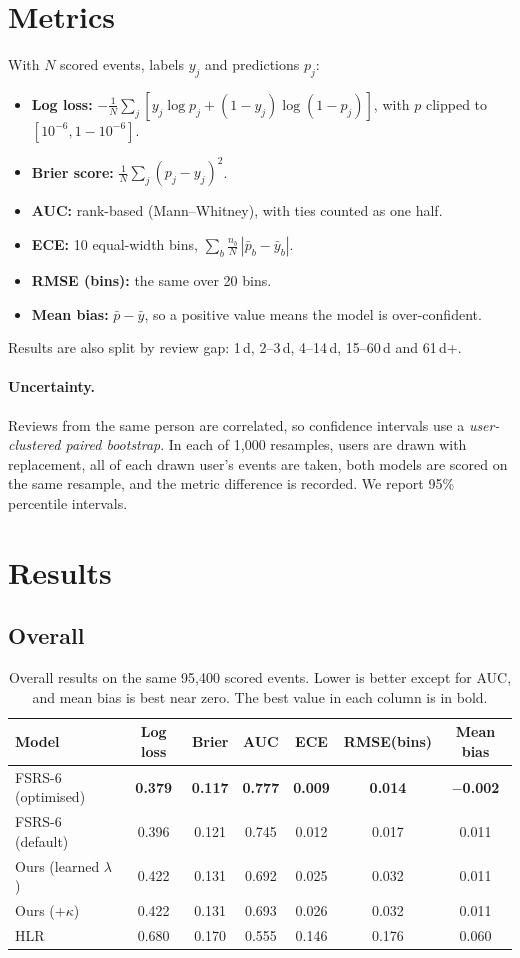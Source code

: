 \documentclass[11pt,a4paper]{article}
\newcommand{\best}[1]{\textbf{#1}}
\begin{document}
\section{Metrics}
With $N$ scored events, labels $y_j$ and predictions $p_j$:
\begin{itemize}
  \item \textbf{Log loss:} $-\frac1N\sum_j[y_j\log p_j+(1-y_j)\log(1-p_j)]$, with $p$ clipped to $[10^{-6},1-10^{-6}]$.
  \item \textbf{Brier score:} $\frac1N\sum_j(p_j-y_j)^2$.
  \item \textbf{AUC:} rank-based (Mann--Whitney), with ties counted as one half.
  \item \textbf{ECE:} 10 equal-width bins, $\sum_b \frac{n_b}{N}\,|\bar p_b-\bar y_b|$.
  \item \textbf{RMSE (bins):} the same over 20 bins.
  \item \textbf{Mean bias:} $\bar p-\bar y$, so a positive value means the model is over-confident.
\end{itemize}
Results are also split by review gap: 1\,d, 2--3\,d, 4--14\,d, 15--60\,d and 61\,d+.

\paragraph{Uncertainty.} Reviews from the same person are correlated, so confidence intervals use a \emph{user-clustered paired bootstrap}. In each of 1{,}000 resamples, users are drawn with replacement, all of each drawn user's events are taken, both models are scored on the same resample, and the metric difference is recorded. We report 95\% percentile intervals.

\section{Results}
\subsection{Overall}
\begin{table}[H]
\centering
\caption{Overall results on the same 95{,}400 scored events. Lower is better except for AUC, and mean bias is best near zero. The best value in each column is in bold.}
\label{tab:overall}
\begin{tabular}{lcccccc}
\toprule
Model & Log loss & Brier & AUC & ECE & RMSE(bins) & Mean bias \\
\midrule
FSRS-6 (optimised) & \best{0.379} & \best{0.117} & \best{0.777} & \best{0.009} & \best{0.014} & \best{$-$0.002} \\
FSRS-6 (default)   & 0.396 & 0.121 & 0.745 & 0.012 & 0.017 & 0.011 \\
Ours (learned $\lambda$) & 0.422 & 0.131 & 0.692 & 0.025 & 0.032 & 0.011 \\
Ours ($+\kappa$)   & 0.422 & 0.131 & 0.693 & 0.026 & 0.032 & 0.011 \\
HLR                & 0.680 & 0.170 & 0.555 & 0.146 & 0.176 & 0.060 \\
\bottomrule
\end{tabular}
\end{table}
\end{document}
